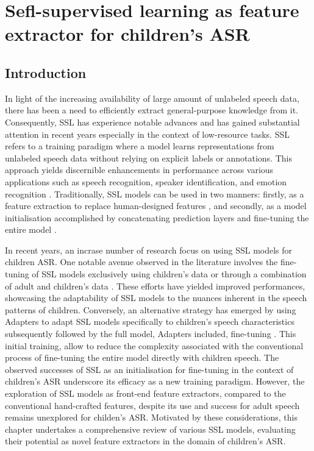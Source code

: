 \chapter{Sefl-supervised learning as feature extractor for children's ASR}
\label{chapter:appendixB}

\section{Introduction}
In light of the increasing availability of large amount of unlabeled speech data, there has been a need to efficiently extract general-purpose knowledge from it. Consequently, SSL has experience notable advances and has gained substantial attention in recent years especially in the context of low-resource tasks. SSL refers to a training paradigm where a model learns representations from unlabeled speech data without relying on explicit labels or annotations. This approach yields discernible enhancements in performance across various applications such as speech recognition, speaker identification, and emotion recognition \cite{baevski2020wav2vec}. Traditionally, SSL models can be used in two manners: firstly, as a feature extraction to replace human-designed features \cite{yang21c_interspeech,chang2021exploration}, and secondly, as a model initialisation accomplished by concatenating prediction layers and fine-tuning the entire model \cite{fan2022draft,jain2023wav2vec2,wang2021fine,li2021accent}.

In recent years, an incrase number of research focus on using SSL models for children ASR. One notable avenue observed in the literature involves the fine-tuning of SSL models exclusively using children's data \cite{jain2023adaptation} or through a combination of adult and children's data \cite{jain2023wav2vec2}. These efforts have yielded improved performances, showcasing the adaptability of SSL models to the nuances inherent in the speech patterns of children. Conversely, an alternative strategy has emerged by using Adapters to adapt SSL models specifically to children's speech characteristics subsequently followed by the full model, Adapters included, fine-tuning \cite{fan2022draft}. This initial training, allow to reduce the complexity associated with the conventional process of fine-tuning the entire model directly with children speech.
The observed successes of SSL as an initialisation for fine-tuning in the context of children's ASR underscore its efficacy as a new training paradigm. However, the exploration of SSL models as front-end feature extractors, compared to the conventional hand-crafted features, despite its use and success for adult speech \cite{yang21c_interspeech,chang2021exploration} remains unexplored for childen's ASR. Motivated by these considerations, this chapter undertakes a comprehensive review of various SSL models, evaluating their potential as novel feature extractors in the domain of children's ASR.
